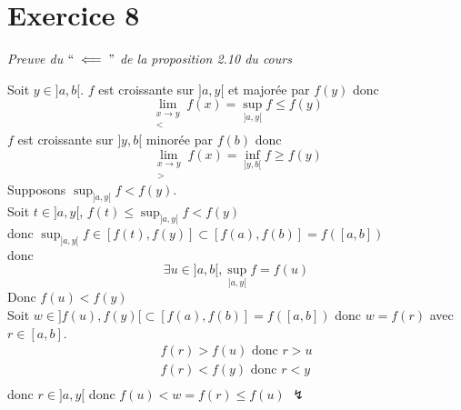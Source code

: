 \part{Exercice 8}
\begin{center}
	{\it Preuve du $``\impliedby"$ de la proposition 2.10 du cours}
\end{center}

Soit $y \in ]a,b[$. $f$ est croissante sur $]a,y[$ et majorée par $f(y)$ donc \[
	\lim_{\substack{x\to y\\<}}f(x) = \sup_{]a,y[}f \le f(y)
\]
$f$ est croissante sur $]y,b[$ minorée par $f(b)$ donc \[
	\lim_{\substack{x \to y\\>}}f(x) = \inf_{]y,b[}f \ge f(y)
\] Supposons $\sup_{]a,y[}f < f(y)$.\\
Soit $t \in ]a,y[$, $f(t) \le \sup_{]a,y[}f <f(y)$ \\
donc $\sup_{]a,y[}f \in [f(t),f(y)] \subset [f(a),f(b)] = f([a,b])$\\
donc \[
	\exists u \in ]a,b[, \sup_{]a,y[}f = f(u)
\] 
Donc $f(u) < f(y)$ \\
Soit $w \in ]f(u),f(y)[ \subset [f(a),f(b)] = f([a,b])$ donc $w = f(r)$ avec $r \in [a,b]$.
\begin{align*}
	f(r) > f(u) \text{ donc } r> u\\
	f(r) < f(y) \text{ donc } r< y\\
\end{align*}
donc $r \in ]a,y[$ donc $f(u) < w = f(r) \le f(u)$ $\lightning$
